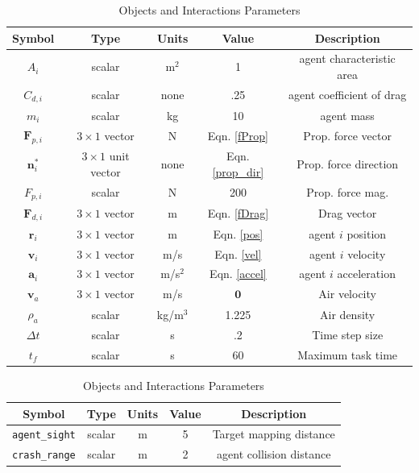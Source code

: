 \documentclass{article}
\begin{document}
\begin{table}[H]
 \begin{center}
  \caption{Dynamics and Integration Parameters}
  \begin{tabular}{||c|c|c|c|c||}
    \hline
    Symbol & Type & Units & Value & Description \\
    \hline \hline
        $A_i$ & scalar & m$^2$ & 1 & agent characteristic area\\
    $C_{d,i}$ & scalar & none & .25 & agent coefficient of drag\\
        $m_i$ & scalar & kg & 10 & agent mass\\
     $\boldsymbol{F}_{p,i}$ & $3 \times 1$ vector & N & Eqn. \ref{fProp} & Prop. force vector \\ 
      $\boldsymbol{n}^*_{i}$ & $3 \times 1$ unit vector & none & Eqn. \ref{prop_dir} & Prop. force direction \\ 
    $F_{p,i}$ & scalar & N & 200 & Prop. force mag.\\
    $\boldsymbol{F}_{d,i}$ & $3 \times 1$ vector & m & Eqn. \ref{fDrag} & Drag vector \\ 
    $\boldsymbol{r}_i$ & $3 \times 1$ vector & m & Eqn. \ref{pos} & agent $i$ position \\ 
     $\boldsymbol{v}_i$ & $3 \times 1$ vector & m/s & Eqn. \ref{vel} & agent $i$ velocity \\ 
      $\boldsymbol{a}_i$ & $3 \times 1$ vector & m/s$^2$ & Eqn. \ref{accel} & agent $i$ acceleration \\ 
    $\boldsymbol{v}_a$ & $3 \times 1$ vector & m/s & $\boldsymbol{0}$& Air velocity\\
    $\rho_a$ & scalar & kg/m$^3$& 1.225 & Air density\\
        $\Delta t$ & scalar & s & .2 & Time step size \\
    $t_f$ & scalar & s & 60 & Maximum task time \\
    \hline
  \end{tabular}
  \vspace{0.5 cm}
  \caption{Objects and Interactions Parameters}
  \quad
    \begin{tabular}{||c|c|c|c|c||}
    \hline
    Symbol & Type & Units & Value & Description \\
    \hline \hline
        {\tt agent\_sight} & scalar & m & 5 & Target mapping distance\\
    {\tt crash\_range} & scalar & m & 2 & agent collision distance\\
  

\end{tabular}
\end{center}
\end{table}
\end{document}
